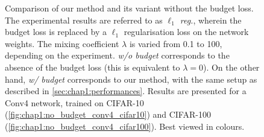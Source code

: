 \begin{figure}
  \centering
    \caption{ Comparison of our method and its variant without the budget loss.
    The experimental results are referred to as \emph{$\ell_1$ reg.}, wherein
    the budget loss is replaced by a $\ell_1$ regularisation loss on the network
    weights. The mixing coefficient $\lambda$ is varied from 0.1 to 100,
    depending on the experiment. \emph{w/o budget} corresponds to the absence of
    the budget loss (this is equivalent to $\lambda = 0$). On the other hand,
    \emph{w/ budget} corresponds to our method, with the same setup as described
    in \cref{sec:chap1:performances}. Results are presented for a Conv4 network,
    trained on CIFAR-10 (\cref{fig:chap1:no_budget_conv4_cifar10}) and CIFAR-100
    (\cref{fig:chap1:no_budget_conv4_cifar100}). Best viewed in colours.}
  \label{fig:chap1:no_budget_conv4}
\end{figure}



